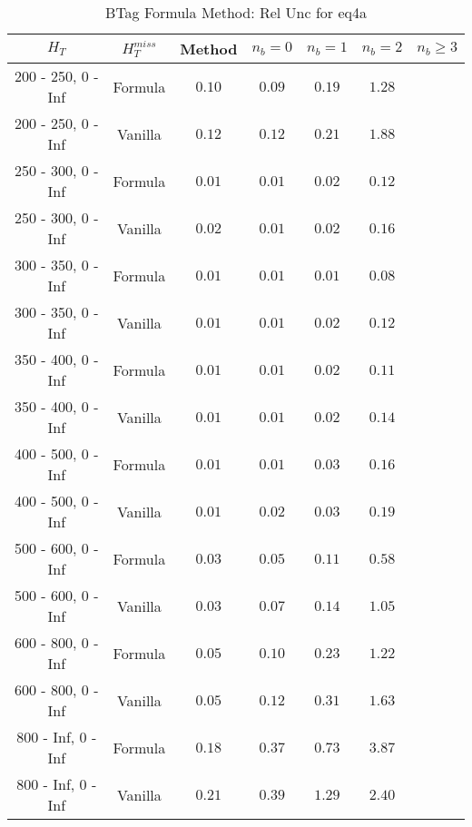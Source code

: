 \begin{longtable}{ | c | c | c | c | c | c | c | }
\caption{BTag Formula Method: Rel Unc for eq4a} \label{tab:eq4a} \\    \hline 
$H_{T}$ & $H_{T}^{miss}$ & Method & $n_{b} = 0$ & $n_{b} = 1$ & $n_{b} = 2$ & $n_{b} \ge 3$ \\ \hline 200 -  250,    0 -  Inf & Formula  & $  0.10 $ & $  0.09 $ & $  0.19 $ & $  1.28 $  \\  
 200 -  250,    0 -  Inf & Vanilla  & $  0.12 $ & $  0.12 $ & $  0.21 $ & $  1.88 $  \\ \hline 
 250 -  300,    0 -  Inf & Formula  & $  0.01 $ & $  0.01 $ & $  0.02 $ & $  0.12 $  \\  
 250 -  300,    0 -  Inf & Vanilla  & $  0.02 $ & $  0.01 $ & $  0.02 $ & $  0.16 $  \\ \hline 
 300 -  350,    0 -  Inf & Formula  & $  0.01 $ & $  0.01 $ & $  0.01 $ & $  0.08 $  \\  
 300 -  350,    0 -  Inf & Vanilla  & $  0.01 $ & $  0.01 $ & $  0.02 $ & $  0.12 $  \\ \hline 
 350 -  400,    0 -  Inf & Formula  & $  0.01 $ & $  0.01 $ & $  0.02 $ & $  0.11 $  \\  
 350 -  400,    0 -  Inf & Vanilla  & $  0.01 $ & $  0.01 $ & $  0.02 $ & $  0.14 $  \\ \hline 
 400 -  500,    0 -  Inf & Formula  & $  0.01 $ & $  0.01 $ & $  0.03 $ & $  0.16 $  \\  
 400 -  500,    0 -  Inf & Vanilla  & $  0.01 $ & $  0.02 $ & $  0.03 $ & $  0.19 $  \\ \hline 
 500 -  600,    0 -  Inf & Formula  & $  0.03 $ & $  0.05 $ & $  0.11 $ & $  0.58 $  \\  
 500 -  600,    0 -  Inf & Vanilla  & $  0.03 $ & $  0.07 $ & $  0.14 $ & $  1.05 $  \\ \hline 
 600 -  800,    0 -  Inf & Formula  & $  0.05 $ & $  0.10 $ & $  0.23 $ & $  1.22 $  \\  
 600 -  800,    0 -  Inf & Vanilla  & $  0.05 $ & $  0.12 $ & $  0.31 $ & $  1.63 $  \\ \hline 
 800 -  Inf,    0 -  Inf & Formula  & $  0.18 $ & $  0.37 $ & $  0.73 $ & $  3.87 $  \\  
 800 -  Inf,    0 -  Inf & Vanilla  & $  0.21 $ & $  0.39 $ & $  1.29 $ & $  2.40 $  \\ \hline 
    \hline 
    \hline 
\end{longtable}
